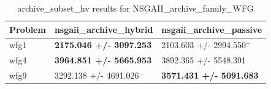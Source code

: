 \begin{table}
\caption{archive_subset_hv results for NSGAII_archive_family_WFG}
\label{NSGAII_archive_family_WFG_archive_subset_hv}
\begin{tabular}{lll}
\toprule
Problem & nsgaii_archive_hybrid & nsgaii_archive_passive \\
\midrule
wfg1 & \textbf{2175.046 +/- 3097.253} & 2103.603 +/- 2994.550$^{-}$ \\
wfg4 & \textbf{3964.851 +/- 5665.953} & 3892.365 +/- 5548.391 \\
wfg9 & 3292.138 +/- 4691.026$^{-}$ & \textbf{3571.431 +/- 5091.683} \\
\bottomrule
\end{tabular}
\end{table}

